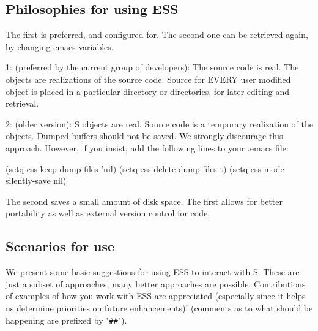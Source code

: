 \documentclass{article}
\begin{document}
\subsection{Philosophies for using ESS}
\label{sec:basic:philosophy}


The first is preferred, and configured for.  The second one can be
retrieved again, by changing emacs variables.

1: (preferred by the current group of developers):  The source code is 
   real.  The objects are realizations of the source code.  Source
   for EVERY user modified object is placed in a particular directory
   or directories, for later editing and retrieval.

2: (older version): S objects are real.  Source code is a temporary
   realization of the objects.  Dumped buffers should not be saved.
   We strongly discourage this approach.  However, if you insist,
   add the following lines to your .emacs file:

      (setq ess-keep-dump-files 'nil)
      (setq ess-delete-dump-files t)
      (setq ess-mode-silently-save nil)

The second saves a small amount of disk space.  The first allows for
better portability as well as external version control for code.


\subsection{Scenarios for use}
\label{sec:basic:scenarios}

We present some basic suggestions for using ESS to interact with S.
These are just a subset of approaches, many better approaches are
possible.  Contributions of examples of how you work with ESS are
appreciated (especially since it helps us determine priorities on
future enhancements)! (comments as to what should be happening are
prefixed by "\verb+##+").
\end{document}
